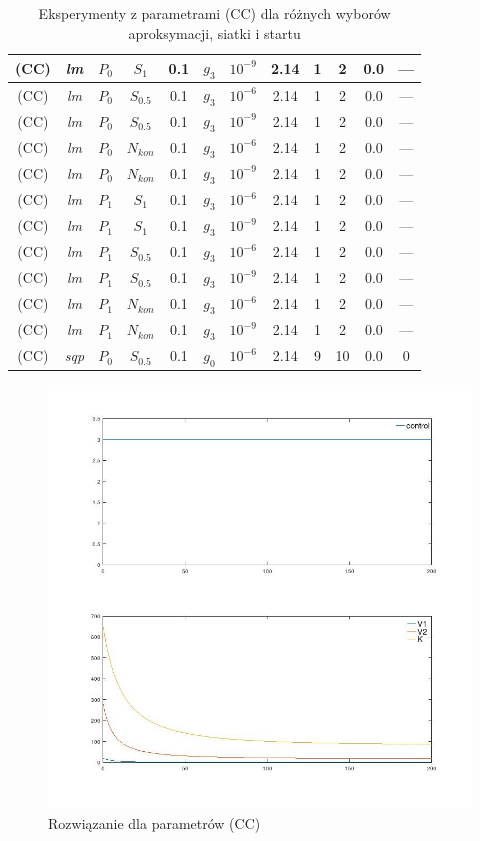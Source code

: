 \documentclass[licencjacka]{pracamgr}
\begin{document}
\begin{table}[h]
\begin{center}
\begin{tabular}{|c|c|c|c|c|c|c||c|c|c|c|c|}
      \hline
      (CC) & {\it lm\/} & $P_0$ & $S_1$ & 0.1 & $g_3$ & $10^{-9}$ & 2.14 & 1 & 2 & 0.0 & --- \\
      \hline
      (CC) & {\it lm\/} & $P_0$ & $S_{0.5}$ & 0.1 & $g_3$ & $10^{-6}$ & 2.14 & 1 & 2 & 0.0 & --- \\
      \hline
      (CC) & {\it lm\/} & $P_0$ & $S_{0.5}$ & 0.1 & $g_3$ & $10^{-9}$ & 2.14 & 1 & 2 & 0.0 & --- \\
      \hline
      (CC) & {\it lm\/} & $P_0$ & $N_{kon}$ & 0.1 & $g_3$ & $10^{-6}$ & 2.14 & 1 & 2 & 0.0 & --- \\
      \hline
      (CC) & {\it lm\/} & $P_0$ & $N_{kon}$ & 0.1 & $g_3$ & $10^{-9}$ & 2.14 & 1 & 2 & 0.0 & --- \\
      \hline
      (CC) & {\it lm\/} & $P_1$ & $S_1$ & 0.1 & $g_3$ & $10^{-6}$ & 2.14 & 1 & 2 & 0.0 & --- \\
      \hline
      (CC) & {\it lm\/} & $P_1$ & $S_1$ & 0.1 & $g_3$ & $10^{-9}$ & 2.14 & 1 & 2 & 0.0 & --- \\
      \hline
      (CC) & {\it lm\/} & $P_1$ & $S_{0.5}$ & 0.1 & $g_3$ & $10^{-6}$ & 2.14 & 1 & 2 & 0.0 & --- \\
      \hline
      (CC) & {\it lm\/} & $P_1$ & $S_{0.5}$ & 0.1 & $g_3$ & $10^{-9}$ & 2.14 & 1 & 2 & 0.0 & --- \\
      \hline
      (CC) & {\it lm\/} & $P_1$ & $N_{kon}$ & 0.1 & $g_3$ & $10^{-6}$ & 2.14 & 1 & 2 & 0.0 & --- \\
      \hline
      (CC) & {\it lm\/} & $P_1$ & $N_{kon}$ & 0.1 & $g_3$ & $10^{-9}$ & 2.14 & 1 & 2 & 0.0 & --- \\
      \hline
      (CC) & {\it sqp\/} & $P_0$ & $S_{0.5}$ & 0.1 & $g_0$ & $10^{-6}$ & 2.14 & 9 & 10 & 0.0 & 0 \\
      \hline
    \end{tabular}
    \caption{Eksperymenty z parametrami (CC) dla różnych wyborów aproksymacji, siatki i startu}\label{param1_tbl}
  \end{center}
\end{table}

\begin{figure}[h]
  \centering
  \includegraphics[width=.5\textwidth]{../plots/plot_max}
  \caption{Rozwiązanie dla parametrów (CC)}\label{max_plot}
\end{figure}
\end{document}

